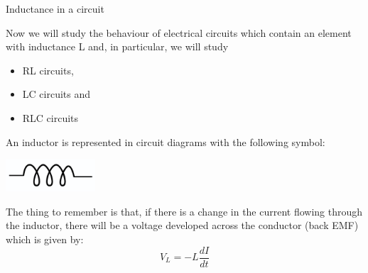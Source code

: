 \begin{frame}{Inductance in a circuit}

Now we will study the behaviour of electrical circuits which contain an element with inductance L
and, in particular, we will study
\begin{itemize}
  \item RL circuits,
  \item LC circuits and
  \item RLC circuits
\end{itemize}

\vspace{0.3cm}

An inductor is represented in circuit diagrams with the following symbol:
\begin{center}
  \includegraphics[width=0.25\textwidth]{./images/schematics/inductance_circuit_symbol.png}\\
\end{center}

\vspace{0.3cm}

The thing to remember is that, if there is a change in the current flowing through the inductor,
there will be a voltage developed across the conductor (back EMF) which is given by:
\begin{equation*}
    V_{L} =  -L \frac{dI}{dt}
\end{equation*}

\end{frame}

%
%
%

